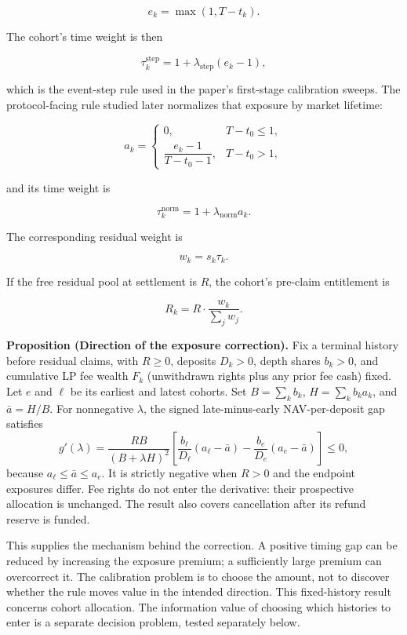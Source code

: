 \documentclass[10pt]{article}
\begin{document}
\[
e_k = \max(1, T - t_k).
\]

The cohort's time weight is then

\[
\tau_k^{\mathrm{step}} = 1 + \lambda_{\mathrm{step}} (e_k - 1),
\]

which is the event-step rule used in the paper's first-stage calibration sweeps. The protocol-facing rule studied later normalizes that exposure by market lifetime:

\[
a_k =
\begin{cases}
0, & T - t_0 \le 1, \\
\dfrac{e_k - 1}{T - t_0 - 1}, & T - t_0 > 1,
\end{cases}
\]

and its time weight is

\[
\tau_k^{\mathrm{norm}} = 1 + \lambda_{\mathrm{norm}} a_k.
\]

The corresponding residual weight is

\[
w_k = s_k \tau_k.
\]

If the free residual pool at settlement is $R$, the cohort's pre-claim entitlement is

\[
R_k = R \cdot \frac{w_k}{\sum_j w_j}.
\]

\textbf{Proposition (Direction of the exposure correction).}
Fix a terminal history before residual claims, with $R\ge0$, deposits $D_k>0$, depth shares $b_k>0$, and cumulative LP fee wealth $F_k$ (unwithdrawn rights plus any prior fee cash) fixed. Let $e$ and $\ell$ be its earliest and latest cohorts. Set $B=\sum_k b_k$, $H=\sum_k b_k a_k$, and $\bar a=H/B$. For nonnegative $\lambda$, the signed late-minus-early NAV-per-deposit gap satisfies
\[
g'(\lambda)=\frac{RB}{(B+\lambda H)^2}
\left[\frac{b_\ell}{D_\ell}(a_\ell-\bar a)
      -\frac{b_e}{D_e}(a_e-\bar a)\right]\le0,
\]
because $a_\ell\le\bar a\le a_e$. It is strictly negative when $R>0$ and the endpoint exposures differ. Fee rights do not enter the derivative: their prospective allocation is unchanged. The result also covers cancellation after its refund reserve is funded.

This supplies the mechanism behind the correction. A positive timing gap can be reduced by increasing the exposure premium; a sufficiently large premium can overcorrect it. The calibration problem is to choose the amount, not to discover whether the rule moves value in the intended direction. This fixed-history result concerns cohort allocation. The information value of choosing which histories to enter is a separate decision problem, tested separately below.
\end{document}
